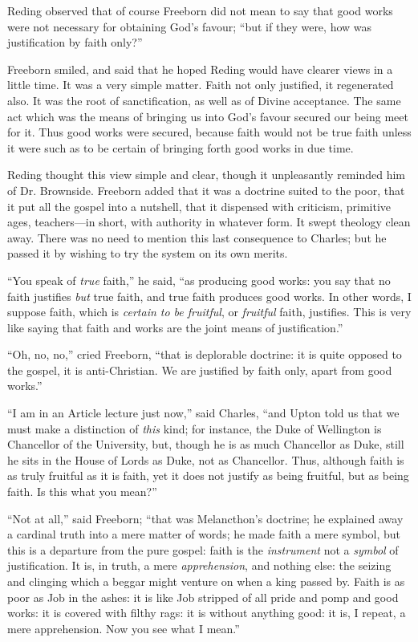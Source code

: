 Reding observed that of course Freeborn did not mean to say that
good works were not necessary for obtaining God's favour; ``but if
they were, how was justification by faith only?''

Freeborn smiled, and said that he hoped Reding would have clearer
views in a little time. It was a very simple matter. Faith not only
justified, it regenerated also. It was the root of
sanctification, as well as of Divine acceptance. The same act which
was the means of bringing us into God's favour secured our being meet
for it. Thus good works were secured, because faith would not be true
faith unless it were such as to be certain of bringing forth good
works in due time.

Reding thought this view simple and clear, though it unpleasantly
reminded him of Dr. Brownside. Freeborn added that it was a doctrine
suited to the poor, that it put all the gospel into a nutshell, that
it dispensed with criticism, primitive ages, teachers—in short, with
authority in whatever form. It swept theology clean away. There was no
need to mention this last consequence to Charles; but he passed it by
wishing to try the system on its own merits.

``You speak of \emph{true} faith,'' he said, ``as
producing good works: you say that no faith justifies \emph{but} true
faith, and true faith produces good works. In other words, I suppose
faith, which is \emph{certain to be fruitful}, or \emph{fruitful}
faith, justifies. This is very like saying that faith and works are
the joint means of justification.''

``Oh, no, no,'' cried Freeborn, ``that is deplorable
doctrine: it is quite opposed to the gospel, it is anti-Christian. We
are justified by faith only, apart from good works.''

``I am in an Article lecture just now,'' said Charles,
``and Upton told us that we must make a distinction of \emph{this}
kind; for instance, the Duke of Wellington is Chancellor of the
University, but, though he is as much Chancellor as Duke, still he
sits in the House of Lords as Duke, not as Chancellor. Thus,
although faith is as truly fruitful as it is faith, yet it does not
justify as being fruitful, but as being faith. Is this what you
mean?''

``Not at all,'' said Freeborn; ``that was Melancthon's
doctrine; he explained away a cardinal truth into a mere matter of
words; he made faith a mere symbol, but this is a departure from the
pure gospel: faith is the \emph{instrument} not a \emph{symbol} of
justification. It is, in truth, a mere \emph{apprehension}, and
nothing else: the seizing and clinging which a beggar might venture on
when a king passed by. Faith is as poor as Job in the ashes: it is
like Job stripped of all pride and pomp and good works: it is covered
with filthy rags: it is without anything good: it is, I repeat, a mere
apprehension. Now you see what I mean.''

